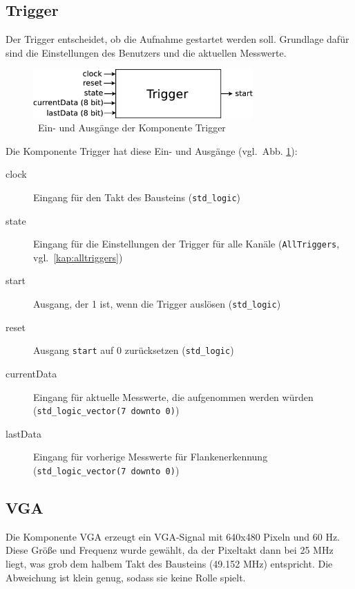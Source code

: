 \documentclass[IN,ngerman,utf8,12pt]{tumbook}
\newcommand{\vgl}{vgl.\ }
\begin{document}
\subsection{Trigger}

Der Trigger entscheidet, ob die Aufnahme gestartet werden soll.
Grundlage dafür sind die Einstellungen des Benutzers und die aktuellen Messwerte.

\begin{figure}[H]
    \centerline{
        \includegraphics[width=0.75\textwidth]{img/trigger}
    }
    \label{abb:trigger}
    \caption{\ Ein- und Ausgänge der Komponente Trigger}
\end{figure}

Die Komponente Trigger hat diese Ein- und Ausgänge (\vgl Abb. \ref{abb:trigger}):

\begin{description}
    \item[clock] Eingang für den Takt des Bausteins (\texttt{std\_logic})
    \item[state] Eingang für die Einstellungen der Trigger für alle Kanäle (\texttt{AllTriggers}, \vgl \ref{kap:alltriggers})
    \item[start] Ausgang, der 1 ist, wenn die Trigger auslösen (\texttt{std\_logic})
    \item[reset] Ausgang \texttt{start} auf 0 zurücksetzen (\texttt{std\_logic})
    \item[currentData] Eingang für aktuelle Messwerte, die aufgenommen werden würden \\
        (\texttt{std\_logic\_vector(7 downto 0)})
    \item[lastData] Eingang für vorherige Messwerte für Flankenerkennung \\
        (\texttt{std\_logic\_vector(7 downto 0)})
\end{description}

\subsection{VGA}

Die Komponente VGA erzeugt ein VGA-Signal mit 640x480 Pixeln und 60 Hz.
Diese Größe und Frequenz wurde gewählt, da der Pixeltakt dann bei 25 MHz liegt, was grob dem halbem Takt des Bausteins (49.152 MHz) entspricht.
Die Abweichung ist klein genug, sodass sie keine Rolle spielt.
\end{document}
